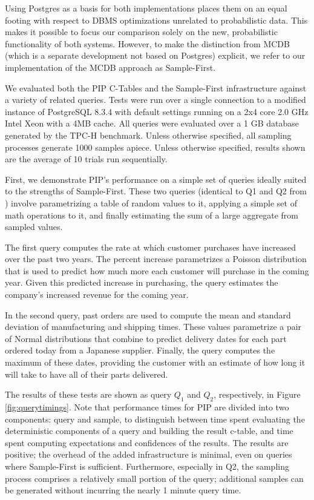 Using Postgres as a basis for both implementations places them on an equal footing with respect to DBMS optimizations unrelated to probabilistic data.  This makes it possible to focus our comparison solely on the new, probabilistic functionality of both systems.  However, to make the distinction from MCDB (which is a separate development not based on Postgres) explicit, we refer to our implementation of the MCDB approach as Sample-First.

We evaluated both the PIP C-Tables and the Sample-First infrastructure against a variety of related queries.  Tests were run over a single connection to a modified instance of PostgreSQL 8.3.4 with default settings running on a 2x4 core 2.0 GHz Intel Xeon with a 4MB cache.  All queries were evaluated over a 1 GB database generated by the TPC-H benchmark.  Unless otherwise specified, all sampling processes generate 1000 samples apiece.  Unless otherwise specified, results shown are the average of 10 trials run sequentially.  



First, we demonstrate PIP's performance on a simple set of queries ideally suited to the strengths of Sample-First.  These two queries (identical to Q1 and Q2 from \cite{MCDB}) involve pa\-ra\-me\-tri\-zing a table of random values to it, applying a simple set of math operations to it, and finally estimating the sum of a large aggregate from sampled values.  

The first query computes the rate at which customer purchases have increased over the past two years.  The percent increase parametrizes a Poisson distribution that is used to predict how much more each customer will purchase in the coming year.  Given this predicted increase in purchasing, the query estimates the company's increased revenue for the coming year.

In the second query, past orders are used to compute the mean and standard deviation of manufacturing and shipping times.  These values parametrize a pair of Normal distributions that combine to predict delivery dates for each part ordered today from a Japanese supplier.  Finally, the query computes the maximum of these dates, providing the customer with an estimate of how long it will take to have all of their parts delivered.

The results of these tests are shown as query $Q_1$ and $Q_2$, respectively, in Figure \ref{fig:querytimings}.  Note that performance times for PIP are divided into two components: query and sample, to distinguish between time spent evaluating the deterministic components of a query and building the result c-table, and time spent computing expectations and confidences of the results.  The results are positive; the overhead of the added infrastructure is minimal, even on queries where Sample-First is sufficient.  Furthermore, especially in Q2, the sampling process comprises a relatively small portion of the query; additional samples can be generated without incurring the nearly 1 minute query time.

